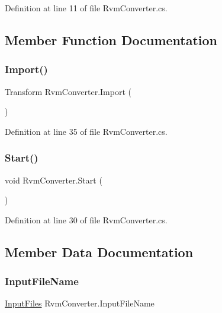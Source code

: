 Definition at line 11 of file Rvm\+Converter.\+cs.



\subsection{Member Function Documentation}
\mbox{\label{class_rvm_converter_a984b9502e39db3fcffc74d3281a1a155}} 
\subsubsection{\texorpdfstring{Import()}{Import()}}
{\footnotesize\ttfamily Transform Rvm\+Converter.\+Import (\begin{DoxyParamCaption}{ }\end{DoxyParamCaption})}



Definition at line 35 of file Rvm\+Converter.\+cs.

\mbox{\label{class_rvm_converter_a3a476e45c2cabe4e69c9a15e4223f2de}} 
\subsubsection{\texorpdfstring{Start()}{Start()}}
{\footnotesize\ttfamily void Rvm\+Converter.\+Start (\begin{DoxyParamCaption}{ }\end{DoxyParamCaption})}



Definition at line 30 of file Rvm\+Converter.\+cs.



\subsection{Member Data Documentation}
\mbox{\label{class_rvm_converter_a3411db3c1a04e63731d19e4253d32ac5}} 
\subsubsection{\texorpdfstring{InputFileName}{InputFileName}}
{\footnotesize\ttfamily \mbox{\hyperlink{_input_files_8cs_afdf73d5dcfa18e5eaca6fa573fcf2590}{Input\+Files}} Rvm\+Converter.\+Input\+File\+Name}



